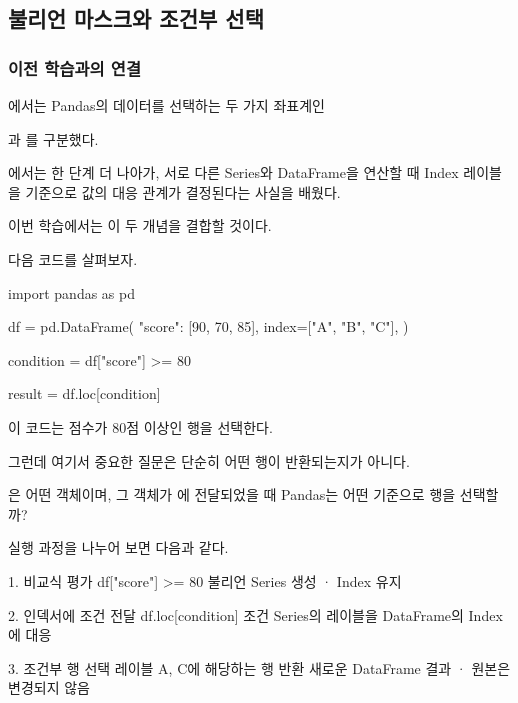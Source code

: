 

\subsection{불리언 마스크와 조건부 선택}

\subsubsection{이전 학습과의 연결}

에서는 Pandas의 데이터를 선택하는 두 가지 좌표계인

과 를 구분했다.

에서는 한 단계 더 나아가, 서로 다른 Series와 DataFrame을 연산할 때 Index 레이블을 기준으로 값의 대응 관계가 결정된다는 사실을 배웠다.

이번 학습에서는 이 두 개념을 결합할 것이다.

다음 코드를 살펴보자.

\begin{dhkcode}
import pandas as pd

df = pd.DataFrame(
    {"score": [90, 70, 85]},
    index=["A", "B", "C"],
)

condition = df["score"] >= 80

result = df.loc[condition]
\end{dhkcode}

이 코드는 점수가 80점 이상인 행을 선택한다.

그런데 여기서 중요한 질문은 단순히 어떤 행이 반환되는지가 아니다.

은 어떤 객체이며, 그 객체가 에 전달되었을 때 Pandas는 어떤 기준으로 행을 선택할까?

실행 과정을 나누어 보면 다음과 같다.

\begin{dhksmry}
    1. 비교식 평가
       df["score"] >= 80
       불리언 Series 생성 · Index 유지

                \da

    2. 인덱서에 조건 전달
       df.loc[condition]
       조건 Series의 레이블을 DataFrame의 Index에 대응

                \da

    3. 조건부 행 선택
       레이블 A, C에 해당하는 행 반환
       새로운 DataFrame 결과 · 원본은 변경되지 않음
\end{dhksmry}

